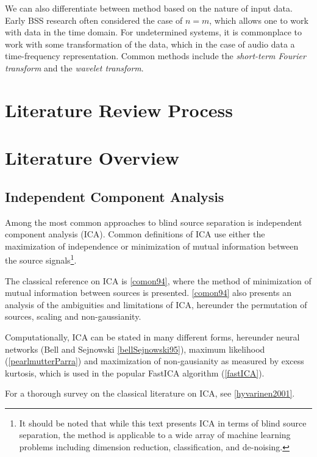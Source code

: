 \documentclass[11pt, oneside, a4paper]{article}
\begin{document}
We can also differentiate between method based on the nature of input data. Early BSS research often considered the case of $n=m$, which allows one to work with data in the time domain. For undetermined systems, it is commonplace to work with some transformation of the data, which in the case of audio data a time-frequency representation. Common methods include the \emph{short-term Fourier transform} and the \emph{wavelet transform}.

\section{Literature Review Process} %



\section{Literature Overview}


\subsection{Independent Component Analysis} %

Among the most common approaches to blind source separation is
independent component analysis (ICA). Common definitions of ICA use
either the maximization of independence or minimization of mutual information between the source
signals\footnote{It should be noted that while this text presents ICA
  in terms of blind source separation, the method is applicable to a
  wide array of machine learning problems including dimension
  reduction, classification, and de-noising.}. 

The classical reference on ICA
is \ref{comon94}, where the method of minimization of mutual
information between sources is presented. \ref{comon94} also presents an
analysis of the ambiguities and limitations of ICA, hereunder the permutation of
sources, scaling and non-gaussianity. 

Computationally, ICA can be stated in many different forms,
hereunder neural networks (Bell and Sejnowski \ref{bellSejnowski95}),
maximum likelihood (\ref{pearlmutterParra}) and maximization of
non-gausianity as measured by excess kurtosis, which is used in the
popular FastICA algorithm (\ref{fastICA}).

For a thorough survey on the classical literature on ICA, see \ref{hyvarinen2001}.


\end{document}

